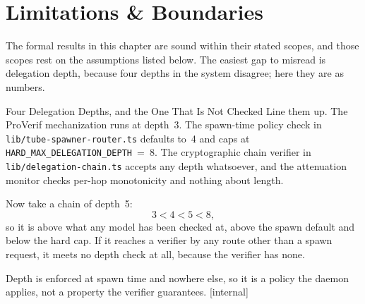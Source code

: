 \documentclass[11pt,a4paper]{article}
\theoremstyle{definition}
\begin{document}
\pdexercisepointer{\ref{ex:anchor-multihop-induction}}{\ref{ex:anchor-macaroon-discharge}}{\pageref{ex:anchor-multihop-induction}}

\section{Limitations \& Boundaries}\label{sec:anchor-limitations-boundaries}

The formal results in this chapter are sound within their stated scopes, and those scopes rest on the assumptions listed below. The easiest gap to misread is delegation depth, because four depths in the system disagree; here they are as numbers.

\begin{pdexample}{Four Delegation Depths, and the One That Is Not Checked}
\setlength{\parskip}{4pt plus 1pt}
Line them up. The ProVerif mechanization runs at depth~3. The spawn-time
policy check in \texttt{lib/tube-spawner-router.ts} defaults to~4 and caps
at \texttt{HARD\_MAX\_DELEGATION\_DEPTH}~=~8. The cryptographic chain verifier
in \texttt{lib/delegation-chain.ts} accepts any depth whatsoever, and the
attenuation monitor checks per-hop monotonicity and nothing about length.

Now
take a chain of depth~5:
\[
3 < 4 < 5 < 8,
\]
so it is above what any model has
been checked at, above the spawn default and below the hard cap. If it
reaches a verifier by any route other than a spawn request, it meets no depth
check at all, because the verifier has none.

Depth is enforced at spawn time and nowhere else, so it is a policy the
daemon applies, not a property the verifier guarantees. [internal]
\end{pdexample}
\end{document}
